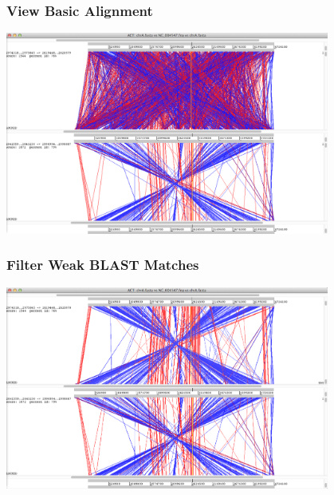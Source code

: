 \begin{frame}
  \frametitle{View Basic Alignment}    
  \begin{center}
    \includegraphics[width=0.8\textwidth]{images/act_wgs9}     
  \end{center}
\end{frame}

\begin{frame}
  \frametitle{Filter Weak BLAST Matches}    
  \begin{center}
    \includegraphics[width=0.8\textwidth]{images/act_wgs10}     
  \end{center}
\end{frame}
